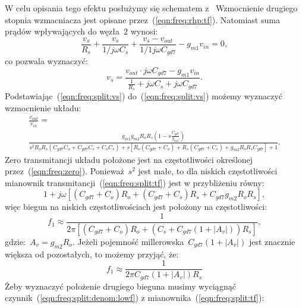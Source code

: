 \documentclass[twoside,pl,final]{labman}
\begin{document}
W celu opisania tego efektu posłużymy się
schematem z~
Wzmocnienie drugiego stopnia wzmacniacza jest opisane
przez~(\ref{eqn:freq:rhp:tf}).
Natomiast suma prądów wpływających do węzła~$2$ wynosi:
\begin{equation}
  \frac{v_s}{R_s} +
  \frac{v_s}{1 / j \omega C_s} +
  \frac{v_s - v_{out}}{1 / 1 j \omega C_{gd7}} -
  g_{m1} v_{in} = 0,
  \label{eqn:freq:split:kirchoff}
\end{equation}
co pozwala wyznaczyć:
\begin{equation}
  v_s = \frac{v_{out} \cdot j \omega C_{gd7} - g_{m1} v_{in}}
        {\frac{1}{R_s} + j \omega C_s + j \omega C_{gd7}}.
  \label{eqn:freq:split:vs}
\end{equation}
Podstawiając~(\ref{eqn:freq:split:vs}) do~(\ref{eqn:freq:split:vs})
możemy wyznaczyć wzmocnienie układu:
\begin{align}
  \frac{v_{out}}{v_{in}} = \nonumber \\
  \frac{g_{m1} g_{m2} R_o R_s (1 - s \frac{C_{gd7}}{g_{m2}})}
    {s^2 R_o R_s (C_{gd7} C_o + C_{gd7} C_s + C_o C_s) +
    s[R_o (C_{gd7} + C_o) + R_s (C_{gd7} + C_s) + g_{m2} R_o R_s C_{gd7}] + 1}.
  \label{eqn:freq:split:tf}
\end{align}
Zero transmitancji układu położone jest na
częstotliwości określonej przez~(\ref{eqn:freq:zero}).
Ponieważ~$s^2$ jest małe,
to dla niskich częstotliwości mianownik
transmitancji~(\ref{eqn:freq:split:tf})
jest w przybliżeniu równy:
\begin{equation}
  1 + j \omega [(C_{gd7} + C_o) R_o +
                (C_{gd7} + C_s) R_s +
                C_{gd7} g_{m2} R_o R_s],
  \label{eqn:freq:split:denom:lowf}
\end{equation}
więc biegun na niskich częstotliwościach jest położony na częstotliwości:
\begin{equation}
  f_1 \approx \frac{1}{2 \pi [(C_{gd7} + C_o) R_o +
                              (C_s + C_{gd7} (1 + |A_v|)) R_s]},
  \label{eqn:freq:split:pole:low}
\end{equation}
gdzie:~$A_v = g_{m2} R_o$.
Jeżeli pojemność millerowska~$C_{gd7} (1 + |A_v|)$ jest
znacznie większa od pozostałych, to możemy przyjąć, że:
\begin{equation}
  f_1 \approx \frac{1}{2 \pi C_{gd7} (1 + |A_v|) R_s}
  \label{eqn:freq:split:pole:low:approx}
\end{equation}
Żeby wyznaczyć położenie drugiego bieguna musimy
wyciągnąć czynnik~(\ref{eqn:freq:split:denom:lowf})
z mianownika~(\ref{eqn:freq:split:tf}):
\end{document}
